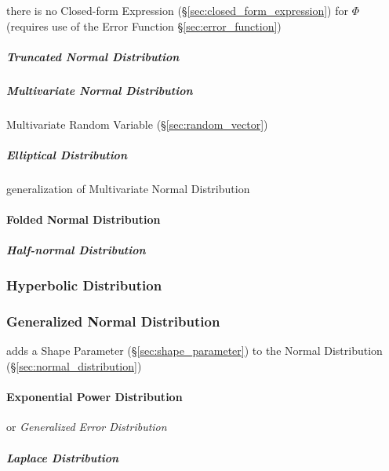 there is no Closed-form Expression (\S\ref{sec:closed_form_expression}) for
$\Phi$ (requires use of the Error Function \S\ref{sec:error_function})



\subparagraph{Truncated Normal Distribution}\label{sec:truncated_normal}\hfill

\subparagraph{Multivariate Normal Distribution}\label{sec:multivariate_normal}
\hfill

Multivariate Random Variable (\S\ref{sec:random_vector})



\subparagraph{Elliptical Distribution}\label{sec:elliptical_distribution}
\hfill

generalization of Multivariate Normal Distribution



\paragraph{Folded Normal Distribution}\label{sec:folded_normal}\hfill

\subparagraph{Half-normal Distribution}\label{sec:half_normal}\hfill



\subsubsection{Hyperbolic Distribution}\label{sec:hyperbolic_distribution}

\subsubsection{Generalized Normal Distribution}\label{sec:generalized_normal}

adds a Shape Parameter (\S\ref{sec:shape_parameter}) to the Normal Distribution
(\S\ref{sec:normal_distribution})



\paragraph{Exponential Power Distribution}\label{sec:exponential_power}\hfill

or \emph{Generalized Error Distribution}



\subparagraph{Laplace Distribution}\label{sec:laplace_distribution}\hfill



